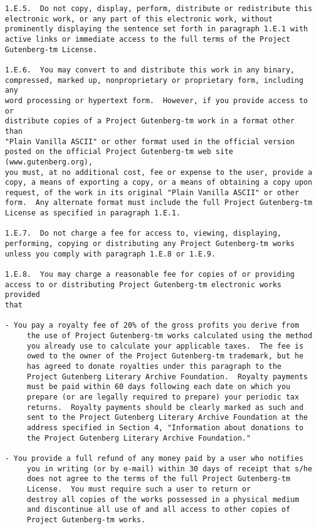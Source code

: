 \begin{Verbatim}[fontsize=\footnotesize]
1.E.5.  Do not copy, display, perform, distribute or redistribute this
electronic work, or any part of this electronic work, without
prominently displaying the sentence set forth in paragraph 1.E.1 with
active links or immediate access to the full terms of the Project
Gutenberg-tm License.

1.E.6.  You may convert to and distribute this work in any binary,
compressed, marked up, nonproprietary or proprietary form, including any
word processing or hypertext form.  However, if you provide access to or
distribute copies of a Project Gutenberg-tm work in a format other than
"Plain Vanilla ASCII" or other format used in the official version
posted on the official Project Gutenberg-tm web site (www.gutenberg.org),
you must, at no additional cost, fee or expense to the user, provide a
copy, a means of exporting a copy, or a means of obtaining a copy upon
request, of the work in its original "Plain Vanilla ASCII" or other
form.  Any alternate format must include the full Project Gutenberg-tm
License as specified in paragraph 1.E.1.

1.E.7.  Do not charge a fee for access to, viewing, displaying,
performing, copying or distributing any Project Gutenberg-tm works
unless you comply with paragraph 1.E.8 or 1.E.9.

1.E.8.  You may charge a reasonable fee for copies of or providing
access to or distributing Project Gutenberg-tm electronic works provided
that

- You pay a royalty fee of 20% of the gross profits you derive from
     the use of Project Gutenberg-tm works calculated using the method
     you already use to calculate your applicable taxes.  The fee is
     owed to the owner of the Project Gutenberg-tm trademark, but he
     has agreed to donate royalties under this paragraph to the
     Project Gutenberg Literary Archive Foundation.  Royalty payments
     must be paid within 60 days following each date on which you
     prepare (or are legally required to prepare) your periodic tax
     returns.  Royalty payments should be clearly marked as such and
     sent to the Project Gutenberg Literary Archive Foundation at the
     address specified in Section 4, "Information about donations to
     the Project Gutenberg Literary Archive Foundation."

- You provide a full refund of any money paid by a user who notifies
     you in writing (or by e-mail) within 30 days of receipt that s/he
     does not agree to the terms of the full Project Gutenberg-tm
     License.  You must require such a user to return or
     destroy all copies of the works possessed in a physical medium
     and discontinue all use of and all access to other copies of
     Project Gutenberg-tm works.


\end{Verbatim}
